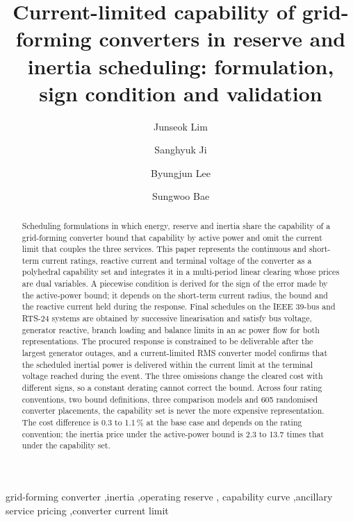 \documentclass[final,5p,times,twocolumn]{elsarticle}
\begin{document}
\begin{frontmatter}

\title{Current-limited capability of grid-forming converters in reserve and
inertia scheduling: formulation, sign condition and validation}

\author[hyu]{Junseok Lim}
\author[hyu]{Sanghyuk Ji}
\author[hyu]{Byungjun Lee}
\author[hyu]{Sungwoo Bae}
\address[hyu]{Department of Electrical Engineering, Hanyang University,
Seoul, Republic of Korea}

\begin{abstract}
Scheduling formulations in which energy, reserve and inertia share the
capability of a grid-forming converter bound that capability by active power
and omit the current limit that couples the three services. This paper
represents the continuous and short-term current ratings, reactive current
and terminal voltage of the converter as a polyhedral capability set and
integrates it in a multi-period linear clearing whose prices are dual
variables. A piecewise condition is derived for the sign of the error made by
the active-power bound; it depends on the short-term current radius, the
bound and the reactive current held during the response. Final schedules on
the IEEE 39-bus and RTS-24 systems are obtained by successive linearisation
and satisfy bus voltage, generator reactive, branch loading and balance
limits in an ac power flow for both representations. The procured response
is constrained to be deliverable after the largest generator outages, and a
current-limited RMS converter model confirms that the scheduled inertial
power is delivered within the current limit at the terminal voltage reached
during the event. The three omissions change the cleared cost with different
signs, so a constant derating cannot correct the bound. Across four rating
conventions, two bound definitions, three comparison models and 605
randomised converter placements, the capability set is never the more
expensive representation. The cost difference is 0.3 to 1.1\,\% at the base
case and depends on the rating convention; the inertia price under the
active-power bound is 2.3 to 13.7 times that under the capability set.
\end{abstract}

\begin{keyword}
grid-forming converter \sep inertia \sep operating reserve \sep
capability curve \sep ancillary service pricing \sep converter current limit
\end{keyword}

\end{frontmatter}
\end{document}
